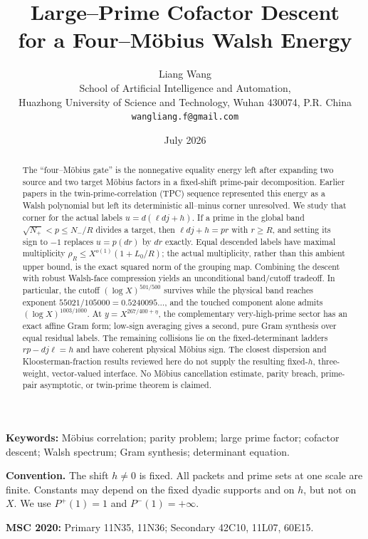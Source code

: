 \documentclass[11pt]{article}
\title{\bfseries Large--Prime Cofactor Descent\\
for a Four--M\"obius Walsh Energy}
\author{Liang Wang\\
\small School of Artificial Intelligence and Automation,\\[-2pt]
\small Huazhong University of Science and Technology, Wuhan 430074, P.R. China\\
\small \texttt{wangliang.f@gmail.com}}
\date{July 2026}
\theoremstyle{definition}
\theoremstyle{remark}
\begin{document}
\maketitle

\begin{abstract}
The ``four--M\"obius gate'' is the nonnegative equality energy left
after expanding two source and two target M\"obius factors in a
fixed-shift prime-pair decomposition.  Earlier papers in the
twin-prime-correlation (TPC) sequence represented this energy as a
Walsh polynomial but left its deterministic all--minus corner
unresolved.  We study that corner for the actual labels
\(u=d(\ell d j+h)\).  If a prime in the global band
\(\sqrt{N_+}<p\le N_-/R\) divides a target, then
\(\ell d j+h=pr\) with \(r\ge R\), and setting its sign to \(-1\)
replaces \(u=p(dr)\) by \(dr\) exactly.  Equal descended labels have
maximal multiplicity
\(\rho_R\le X^{o(1)}(1+L_0/R)\); the actual multiplicity, rather than
this ambient upper bound, is the exact squared norm of the grouping
map.  Combining the descent with robust Walsh-face compression yields
an unconditional band/cutoff tradeoff.  In particular, the cutoff
\((\log X)^{501/500}\) survives while the physical band reaches
exponent \(55021/105000=0.5240095\ldots\), and the touched component
alone admits \((\log X)^{1003/1000}\).  At
\(y=X^{267/400+\eta}\), the complementary very-high-prime sector has
an exact affine Gram form; low-sign averaging gives a second, pure Gram
synthesis over equal residual labels.  The remaining collisions lie on
the fixed-determinant ladders \(rp-dj\ell=h\) and have coherent physical
M\"obius sign.  The closest dispersion and Kloosterman-fraction results
reviewed here do not supply the resulting fixed-\(h\), three-weight,
vector-valued interface.  No M\"obius cancellation estimate, parity
breach, prime-pair asymptotic, or twin-prime theorem is claimed.
\end{abstract}

\noindent\textbf{Keywords:} M\"obius correlation; parity problem;
large prime factor; cofactor descent; Walsh spectrum; Gram synthesis;
determinant equation.

\medskip
\noindent\textbf{Convention.}
The shift \(h\ne0\) is fixed.  All packets and prime sets at one scale
are finite.  Constants may depend on the fixed dyadic supports and on
\(h\), but not on \(X\).  We use \(P^+(1)=1\) and
\(P^-(1)=+\infty\).

\medskip
\noindent\textbf{MSC 2020:} Primary 11N35, 11N36; Secondary 42C10,
11L07, 60E15.














\begingroup
\small
\raggedright
\setlength{\bibsep}{4pt plus 1pt minus 1pt}


\endgroup
\end{document}
